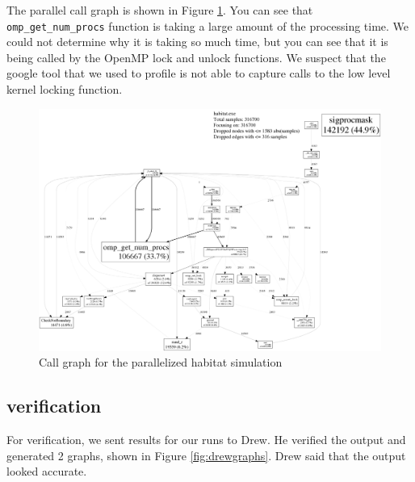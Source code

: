 \documentclass[12pt, notitlepage]{article}
\begin{document}
The parallel call graph is shown in Figure \ref{fig:parallelcall}.  You can see that \texttt{omp\_get\_num\_procs} function is taking a large amount of the processing time.  We could not determine why it is taking so much time, but you can see that it is being called by the OpenMP lock and unlock functions.  We suspect that the google tool that we used to profile is not able to capture calls to the low level kernel locking function.

\begin{figure}[ht]
\includegraphics[width=\textwidth]{Include/parallelcall.pdf}
\caption{Call graph for the parallelized habitat simulation} \label{fig:parallelcall}
\end{figure}

\subsection{verification}
For verification, we sent results for our runs to Drew.  He verified the output and generated 2 graphs, shown in Figure \ref{fig:drewgraphs}.  Drew said that the output looked accurate.
\end{document}
